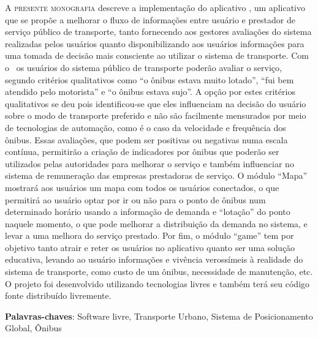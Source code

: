 \lettrine{A}{ presente monografia} descreve a implementação do aplicativo \trilhasp, um aplicativo que se propõe a melhorar o fluxo de informações entre usuário e prestador de serviço público de transporte, tanto fornecendo aos gestores avaliações do sistema realizadas pelos usuários quanto disponibilizando aos usuários informações para uma tomada de decisão mais consciente ao utilizar o sistema de transporte.
Com o \trilhasp~os usuários do sistema público de transporte poderão avaliar o serviço, segundo critérios qualitativos como ``o ônibus estava muito lotado'', ``fui bem atendido pelo motorista'' e ``o ônibus estava sujo''. A opção por estes critérios qualitativos se deu pois identificou-se que eles influenciam na decisão do usuário sobre o modo de transporte preferido e não são facilmente mensurados por meio de tecnologias de automação, como é o caso da velocidade e frequência dos ônibus. Essas avaliações, que podem ser positivas ou negativas numa escala contínua, permitirão a criação de indicadores por ônibus que poderão ser utilizados pelas autoridades para melhorar o serviço e também influenciar no sistema de remuneração das empresas prestadoras de serviço.
O módulo ``Mapa'' mostrará aos usuários um mapa com todos os usuários conectados, o que permitirá ao usuário optar por ir ou não para o ponto de ônibus num determinado horário usando a informação de demanda e ``lotação'' do ponto naquele momento, o que pode melhorar a distribuição da demanda no sistema, e levar a uma melhora do serviço prestado.
Por fim, o módulo ``game'' tem por objetivo tanto atrair e reter os usuários no aplicativo quanto ser uma solução educativa, levando ao usuário informações e vivência verossímeis à realidade do sistema de transporte, como custo de um ônibus, necessidade de manutenção, etc.
O projeto foi desenvolvido utilizando tecnologias livres e também terá seu código fonte distribuído livremente.

\vspace{\onelineskip}

\vfill

\noindent

\textbf{Palavras-chaves}: Software livre, Transporte Urbano, Sistema de Posicionamento Global, Ônibus
